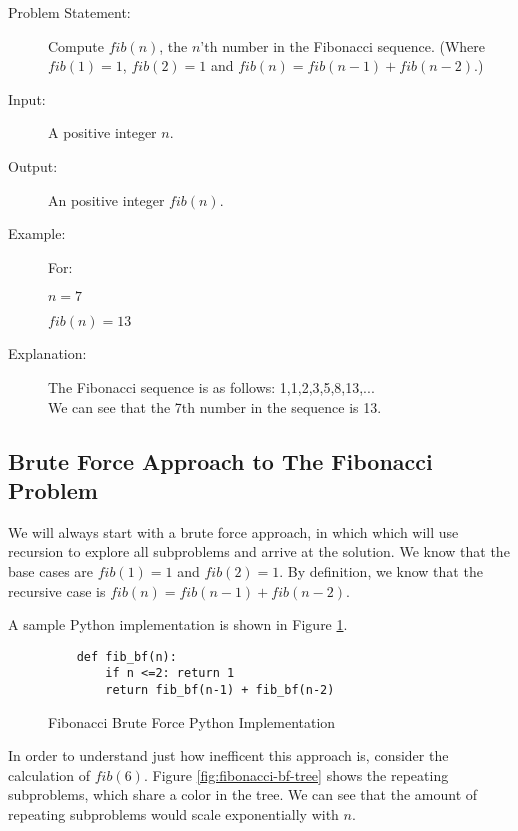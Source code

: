 \begin{description}
    \item[Problem Statement:]
        Compute $fib(n)$, the $n$'th number in the Fibonacci sequence. (Where $fib(1) = 1$, $fib(2) = 1$ and $fib(n) = fib(n-1) + fib(n-2)$.)
        
    \item[Input:] 
        A positive integer $n$.
        
    \item[Output:] 
        An positive integer $fib(n)$.
        
    \item[Example:]
        For: 

        $n = 7$
        
        $fib(n) = 13$

    \item[Explanation:]
        The Fibonacci sequence is as follows: 1,1,2,3,5,8,13,...\\
        We can see that the 7th number in the sequence is 13.

\end{description}


\subsection{Brute Force Approach to The Fibonacci Problem}

We will always start with a brute force approach, in which which will use recursion to explore all subproblems and arrive at the solution. 
We know that the base cases are $fib(1) = 1$ and $fib(2) = 1$.
By definition, we know that the recursive case is $fib(n) = fib(n-1) + fib(n-2)$.

A sample Python implementation is shown in Figure \ref{fig:fibonacci-bf}.

\begin{figure}[H]
    \centering
    \begin{lstlisting}
    def fib_bf(n):
        if n <=2: return 1
        return fib_bf(n-1) + fib_bf(n-2)
    \end{lstlisting}
    \caption{Fibonacci Brute Force Python Implementation}
    \label{fig:fibonacci-bf}
\end{figure}

In order to understand just how inefficent this approach is, consider the calculation of $fib(6)$.
Figure \ref{fig:fibonacci-bf-tree} shows the repeating subproblems, which share a color in the tree.
We can see that the amount of repeating subproblems would scale exponentially with $n$.

